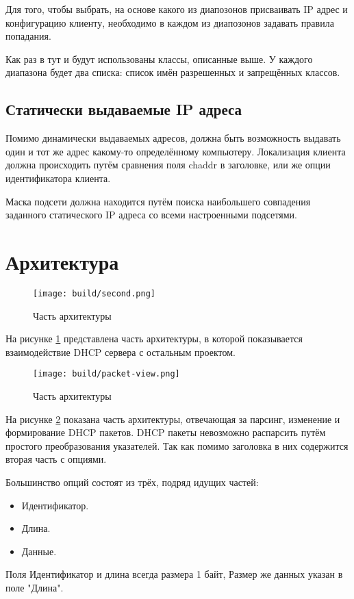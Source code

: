 \documentclass[14pt,a4paper]{extarticle}
\begin{document}
Для того, чтобы выбрать, на основе какого из диапозонов присваивать IP адрес и конфигурацию клиенту, необходимо в каждом из диапозонов задавать правила попадания.

Как раз в тут и будут использованы классы, описанные выше.
У каждого диапазона будет два списка: список имён разрешенных и запрещённых классов.

\subsection{Статически выдаваемые IP адреса}

Помимо динамически выдаваемых адресов, должна быть возможность выдавать один и тот же адрес какому-то определённому компьютеру.
Локализация клиента должна происходить путём сравнения поля chaddr в заголовке, или же опции идентификатора клиента.

Маска подсети должна находится путём поиска наибольшего совпадения заданного статического IP адреса со всеми настроенными подсетями.


\pagebreak
\section{Архитектура}

\begin{figure}[H]
    \texttt{[image: build/second.png]}
    \caption{Часть архитектуры}
    \label{fig:arch}
\end{figure}

На рисунке \ref{fig:arch} представлена часть архитектуры, в которой показывается взаимодействие DHCP сервера с остальным проектом.

\begin{figure}[H]
    \texttt{[image: build/packet-view.png]}
    \caption{Часть архитектуры}
    \label{fig:packet-view}
\end{figure}

На рисунке \ref{fig:packet-view} показана часть архитектуры, отвечающая за парсинг, изменение и формирование DHCP пакетов. DHCP пакеты невозможно распарсить путём простого преобразования указателей. Так как помимо заголовка в них содержится вторая часть с опциями.

Большинство опций состоят из трёх, подряд идущих частей:
\begin{itemize}
    \item Идентификатор.
    \item Длина.
    \item Данные.
\end{itemize}
Поля Идентификатор и длина всегда размера 1 байт, Размер же данных указан в поле "Длина".
\end{document}
